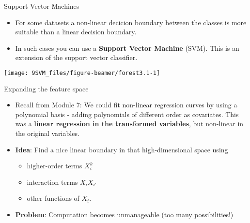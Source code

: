 \documentclass[10pt,ignorenonframetext,]{beamer}
\providecommand{\tightlist}{%
  \setlength{\itemsep}{0pt}\setlength{\parskip}{0pt}}
\begin{document}
\begin{frame}{Support Vector Machines}

\begin{itemize}
\item
  For some datasets a non-linear decicion boundary between the classes
  is more suitable than a linear decision boundary.
\item
  In such cases you can use a \textbf{Support Vector Machine} (SVM).
  This is an extension of the support vector classifier.
\end{itemize}

\begin{center}\texttt{[image: 9SVM\_files/figure-beamer/forest3.1-1]} \end{center}

\end{frame}

\begin{frame}

\begin{block}{Expanding the feature space}

\vspace{2mm}

\begin{itemize}
\tightlist
\item
  Recall from Module 7: We could fit non-linear regression curves by
  using a polynomial basis - adding polynomials of different order as
  covariates. This was a \textbf{linear regression in the transformed
  variables}, but non-linear in the original variables.
\end{itemize}

\vspace{2mm}

\begin{itemize}
\tightlist
\item
  \textbf{Idea}: Find a nice linear boundary in that high-dimensional
  space using

  \begin{itemize}
  \tightlist
  \item
    higher-order terms \(X_i^k\)
  \item
    interaction terms \(X_i X_{i'}\)
  \item
    other functions of \(X_i\).
  \end{itemize}
\end{itemize}

\vspace{2mm}

\begin{itemize}
\tightlist
\item
  \textbf{Problem}: Computation becomes unmanageable (too many
  possibilities!)
\end{itemize}

\end{block}

\end{frame}
\end{document}
